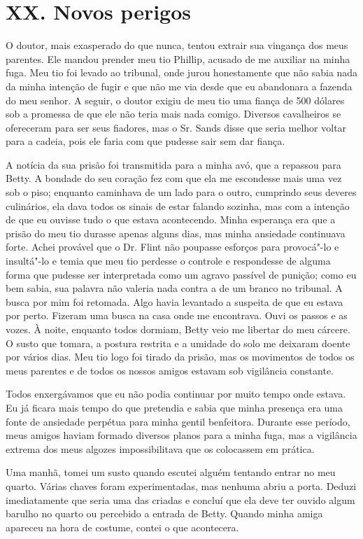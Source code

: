 \chapter{XX. Novos perigos}

O doutor, mais exasperado do que nunca,
tentou extrair sua vingança dos meus parentes. Ele mandou prender meu
tio Phillip, acusado de me auxiliar na minha fuga. Meu tio foi levado ao
tribunal, onde jurou honestamente que não sabia nada da minha intenção
de fugir e que não me via desde que eu abandonara a fazenda do meu
senhor. A seguir, o doutor exigiu de meu tio uma fiança de 500 dólares
sob a promessa de que ele não teria mais nada comigo. Diversos
cavalheiros se ofereceram para ser seus fiadores, mas o Sr. Sands disse
que seria melhor voltar para a cadeia, pois ele faria com que pudesse
sair sem dar fiança.

A notícia da sua prisão foi transmitida
para a minha avó, que a repassou para Betty. A bondade do seu coração
fez com que ela me escondesse mais uma vez sob o piso; enquanto
caminhava de um lado para o outro, cumprindo seus deveres culinários,
ela dava todos os sinais de estar falando sozinha, mas com a intenção de
que eu ouvisse tudo o que estava acontecendo. Minha esperança era que a
prisão do meu tio durasse apenas alguns dias, mas minha ansiedade
continuava forte. Achei provável que o Dr. Flint não poupasse esforços
para provocá"-lo e insultá"-lo e temia que meu tio perdesse o controle e
respondesse de alguma forma que pudesse ser interpretada como um agravo
passível de punição; como eu bem sabia, sua palavra não valeria nada
contra a de um branco no tribunal. A busca por mim foi retomada. Algo
havia levantado a suspeita de que eu estava por perto. Fizeram uma busca
na casa onde me encontrava. Ouvi os passos e as vozes. À noite, enquanto
todos dormiam, Betty veio me libertar do meu cárcere. O susto que
tomara, a postura restrita e a umidade do solo me deixaram doente por
vários dias. Meu tio logo foi tirado da prisão, mas os movimentos de
todos os meus parentes e de todos os nossos amigos estavam sob
vigilância constante.

Todos enxergávamos que eu não podia
continuar por muito tempo onde estava. Eu já ficara mais tempo do que
pretendia e sabia que minha presença era uma fonte de ansiedade perpétua
para minha gentil benfeitora. Durante esse período, meus amigos haviam
formado diversos planos para a minha fuga, mas a vigilância extrema dos
meus algozes impossibilitava que os colocassem em prática.

Uma manhã, tomei um susto quando
escutei alguém tentando entrar no meu quarto. Várias chaves foram
experimentadas, mas nenhuma abriu a porta. Deduzi imediatamente que
seria uma das criadas e concluí que ela deve ter ouvido algum barulho no
quarto ou percebido a entrada de Betty. Quando minha amiga apareceu na
hora de costume, contei o que acontecera.

